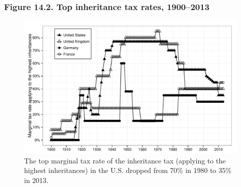 \documentclass[t]{beamer}\usepackage[]{graphicx}\usepackage[]{color}
\newenvironment{knitrout}{}{} %
\begin{document}
\begin{frame}[label=Figure_14_2]
\frametitle{Figure 14.2. Top inheritance tax rates, 1900--2013}
\begin{figure}[t]
\begin{minipage}[b]{\textwidth}
\centering
\begin{knitrout}\footnotesize
{}\color{fgcolor}

{\centering \includegraphics[width=1\linewidth]{figures/bw/Figure_14_2} 

}



\end{knitrout}
\caption{The top marginal tax rate of the inheritance tax (applying to the highest inheritances) in the U.S. dropped from 70\% in 1980 to 35\% in 2013.}
\end{minipage}
\end{figure}
\end{frame}









\end{document}
